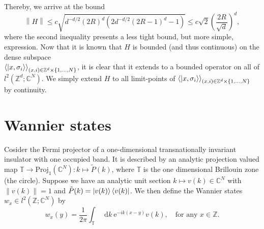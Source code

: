\documentclass[a4paper,11pt]{article}
\newcommand{\euler}[1]{\text{e}^{#1}}
\newcommand{\norm}[1]{\left\lVert #1 \right\rVert}
\newcommand*\diff{\mathop{}\!\mathrm{d}}
\newcommand{\C}{\mathbb{C}}
\newcommand{\Z}{\mathbb{Z}}
\numberwithin{equation}{section}
\begin{document}
 	 Thereby, we arrive at the bound\begin{equation}
 	 \norm{H}\leq c\sqrt{ d^{-d/2} (2R)^d \left(2 d^{-d/2} (2 R-1)^d-1\right)}\leq c\sqrt{2}\left(\frac{2R}{\sqrt{d}}\right)^d,
 	 \end{equation}
 	 where the second inequality presents a less tight bound, but more simple, expression.
 	 Now that it is known that $ H $ is bounded (and thus continuous) on the dense subspace\\ $ \braket{\ket{x,\sigma_i}}_{(x,i)\in\Z^d\times\{1,...,N\}} $, it is clear that it extends to a bounded operator on all of $ l^2(\Z^d;\C^N) $. We simply extend $ H $ to all limit-points of $ \braket{\ket{x,\sigma_i}}_{(x,i)\in\Z^d\times\{1,...,N\}} $ by continuity.
 	 
	\section{Wannier states}
	Cosider the Fermi projector of a one-dimensional transnationally invariant insulator with one occupied band. It is described by an analytic projection valued map $ \mathbb{T}\to \text{Proj}_1(\C^N): k\mapsto \tilde{P}(k) $, where $ \mathbb{T} $ is the one dimensional Brillouin zone (the circle).
	Suppose we have an analytic unit section $ k\mapsto v(k)\in \C^N $ with $ \norm{v(k)}=1 $ and $ \tilde{P}(k)=\ket{v(k)}\bra{v(k)} $. We then define the Wannier states $ w_x\in l^2(\Z;\C^N) $ by\begin{equation}
	w_x(y)=\frac{1}{2\pi}\int_{\mathbb{T}}\diff k\ \euler{-ik(x-y)}v(k),\quad\text{for any }x\in\Z.
	\end{equation}
\end{document}
